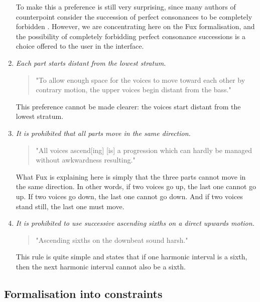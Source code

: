 \begin{enumerate}[wide, label=\bfseries 1.P\arabic*]
    To make this a preference is still very surprising, since many authors of counterpoint consider the succession of perfect consonances to be completely forbidden \cite{Bitsch}. However, we are concentrating here on the Fux formalisation, and the possibility of completely forbidding perfect consonance successions is a choice offered to the user in the interface.

    \item\label{rule:start-distant}  \textit{Each part starts distant from the lowest stratum.}

    \begin{quotation}
    "To allow enough space for the voices to move toward each other by contrary motion, the upper voices begin distant from the bass."
    \textcite[p.75]{GaPEng}
    \end{quotation}

    This preference cannot be made clearer: the voices start distant from the lowest stratum.

    \item\label{rule:same-movement}  \textit{It is prohibited that all parts move in the same direction.}

    \begin{quotation}
    "All voices ascend[ing] [is] a progression which can hardly be managed without awkwardness resulting."
    \textcite[p.76]{GaPEng}
    \end{quotation}

    What Fux is explaining here is simply that the three parts cannot move in the same direction. In other words, if two voices go up, the last one cannot go up. If two voices go down, the last one cannot go down. And if two voices stand still, the last one must move.

    \item\label{rule:ascending-sixths}  \textit{It is prohibited to use successive ascending sixths on a direct upwards motion.}

    \begin{quotation}
    "Ascending sixths on the downbeat sound harsh."
    \textcite[p.77]{GaPEng}
    \end{quotation}

    This rule is quite simple and states that if one harmonic interval is a sixth, then the next harmonic interval cannot also be a sixth.
\end{enumerate}

\subsection{Formalisation into constraints}
